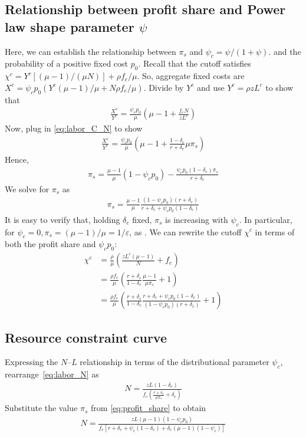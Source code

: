 \documentclass[authoryear, review, 12pt]{elsarticle}
\begin{document}
	\subsection{Relationship between profit share and Power law shape parameter $\psi$} 
	Here, we can establish the relationship between $\pi_s$ and $\psi_c=\psi/(1+\psi)$. and the probability of a positive fixed cost $p_0$. Recall that the cutoff satisfies $\chi^c=Y^c[(\mu-1)/(\mu N)]+\rho f_e/\mu$. So, aggregate fixed costs are $X^c=\psi_c p_0(Y^c(\mu-1)/\mu+N\rho f_e/\mu)$.
	Divide by $Y^c$ and use $Y^c=\rho z L^c$ to show that
	\begin{align}
		\frac{X^c}{Y^c}=\frac{\psi_c p_0}{\mu}\left(\mu-1+\frac{f_eN}{zL^c}\right)
	\end{align}
	Now, plug in \eqref{eq:labor_C_N} to show
	\begin{align}
		\frac{X^c}{Y^c}=\frac{\psi_c p_0}{\mu}\left(\mu-1+\frac{1-\delta_e}{r+\delta_e}\mu \pi_s\right)
	\end{align}
	Hence, 
	\begin{align}
		\pi_s=\frac{\mu-1}{\mu}(1-\psi_c p_0)-\frac{\psi_c p_0(1-\delta_e)\pi_s}{r+\delta_e}
	\end{align}
	We solve for $\pi_s$ as
	\begin{align}\label{eq:profit_share}
		\pi_s=\frac{\mu-1}{\mu}\frac{(1-\psi_cp_0)(r+\delta_e)}{r+\delta_e+\psi_cp_0(1-\delta_e)}
	\end{align}
	It is easy to verify that, holding $\delta_e$ fixed, $\pi_s$ is increasing with $\psi_c$. In particular, for $\psi_c=0, \pi_s=(\mu-1)/\mu=1/\varepsilon$, as \citet{bilbiie_2012}. 
	We can rewrite the cutoff $\chi^c$ in terms of both the profit share and $\psi_c p_0$:
	\begin{align}
		\chi^c&=\frac{\rho}{\mu}\left(\frac{zL^c(\mu-1)}{N}+f_e\right)\\
		&=\frac{\rho f_e}{\mu}\left(\frac{r+\delta_e}{1-\delta_e}\frac{\mu-1}{\mu \pi_s}+1\right)\\
		&=\frac{\rho f_e}{\mu}\left(\frac{r+\delta_e}{1-\delta_e}\frac{r+\delta_e+\psi_cp_0(1-\delta_e)}{(1-\psi_cp_0)(r+\delta_e)}+1\right)
	\end{align}
	
	\subsection{Resource constraint curve}
	Expressing the $N$--$L$ relationship in terms of the distributional parameter $\psi_c$, rearrange~\eqref{eq:labor_N} as 
	\begin{align}
		N=\frac{ zL(1-\delta_e)}{f_e\left(\frac{r+\delta_e}{\mu \pi_s}+\delta_e\right)}
	\end{align}
	Substitute the value $\pi_s$ from \eqref{eq:profit_share} to obtain
	\begin{align}
		N=\frac{zL(\mu-1)(1-\psi_c p_0)}{f_e[r+\delta_e+\psi_c(1-\delta_e)+\delta_e (\mu-1)(1-\psi_c)]}
	\end{align}
	
\end{document}
